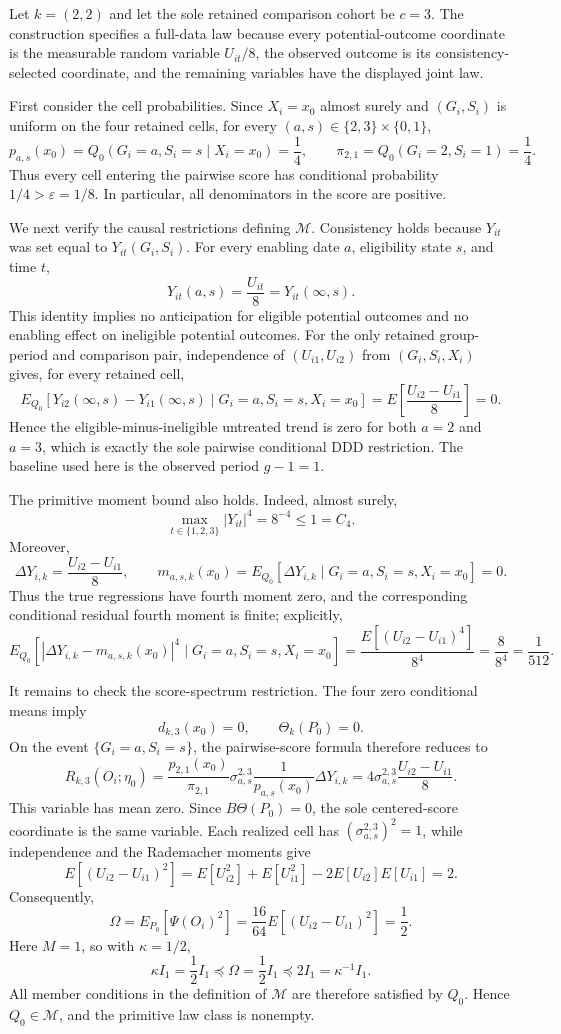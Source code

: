 Let \(k=(2,2)\) and let the sole retained comparison cohort be \(c=3\).  The construction specifies a full-data law because every potential-outcome coordinate is the measurable random variable \(U_{it}/8\), the observed outcome is its consistency-selected coordinate, and the remaining variables have the displayed joint law.

First consider the cell probabilities.  Since \(X_i=x_0\) almost surely and \((G_i,S_i)\) is uniform on the four retained cells, for every \((a,s)\in\{2,3\}\times\{0,1\}\),
\[
p_{a,s}(x_0)=Q_0(G_i=a,S_i=s\mid X_i=x_0)=\frac14,
\qquad
\pi_{2,1}=Q_0(G_i=2,S_i=1)=\frac14.
\]
Thus every cell entering the pairwise score has conditional probability \(1/4>\varepsilon=1/8\).  In particular, all denominators in the score are positive.

We next verify the causal restrictions defining \(\mathcal M\).  Consistency holds because \(Y_{it}\) was set equal to \(Y_{it}(G_i,S_i)\).  For every enabling date \(a\), eligibility state \(s\), and time \(t\),
\[
Y_{it}(a,s)=\frac{U_{it}}8=Y_{it}(\infty,s).
\]
This identity implies no anticipation for eligible potential outcomes and no enabling effect on ineligible potential outcomes.  For the only retained group-period and comparison pair, independence of \((U_{i1},U_{i2})\) from \((G_i,S_i,X_i)\) gives, for every retained cell,
\[
E_{Q_0}\!\left[Y_{i2}(\infty,s)-Y_{i1}(\infty,s)
 \mid G_i=a,S_i=s,X_i=x_0\right]
=E\!\left[\frac{U_{i2}-U_{i1}}8\right]=0.
\]
Hence the eligible-minus-ineligible untreated trend is zero for both \(a=2\) and \(a=3\), which is exactly the sole pairwise conditional DDD restriction.  The baseline used here is the observed period \(g-1=1\).

The primitive moment bound also holds.  Indeed, almost surely,
\[
\max_{t\in\{1,2,3\}}|Y_{it}|^4=8^{-4}\le 1=C_4.
\]
Moreover,
\[
\Delta Y_{i,k}=\frac{U_{i2}-U_{i1}}8,
\qquad
m_{a,s,k}(x_0)=E_{Q_0}[\Delta Y_{i,k}\mid G_i=a,S_i=s,X_i=x_0]=0.
\]
Thus the true regressions have fourth moment zero, and the corresponding conditional residual fourth moment is finite; explicitly,
\[
E_{Q_0}\!\left[|\Delta Y_{i,k}-m_{a,s,k}(x_0)|^4
 \mid G_i=a,S_i=s,X_i=x_0\right]
=\frac{E[(U_{i2}-U_{i1})^4]}{8^4}
=\frac{8}{8^4}=\frac1{512}.
\]

It remains to check the score-spectrum restriction.  The four zero conditional means imply
\[
d_{k,3}(x_0)=0,
\qquad
\Theta_k(P_0)=0.
\]
On the event \(\{G_i=a,S_i=s\}\), the pairwise-score formula therefore reduces to
\[
R_{k,3}(O_i;\eta_0)
=\frac{p_{2,1}(x_0)}{\pi_{2,1}}
  \sigma_{a,s}^{2,3}\frac{1}{p_{a,s}(x_0)}\Delta Y_{i,k}
=4\sigma_{a,s}^{2,3}\frac{U_{i2}-U_{i1}}8.
\]
This variable has mean zero.  Since \(B\Theta(P_0)=0\), the sole centered-score coordinate is the same variable.  Each realized cell has \((\sigma_{a,s}^{2,3})^2=1\), while independence and the Rademacher moments give
\[
E[(U_{i2}-U_{i1})^2]
=E[U_{i2}^2]+E[U_{i1}^2]-2E[U_{i2}]E[U_{i1}]
=2.
\]
Consequently,
\[
\Omega
=E_{P_0}[\Psi(O_i)^2]
=\frac{16}{64}E[(U_{i2}-U_{i1})^2]
=\frac12.
\]
Here \(M=1\), so with \(\kappa=1/2\),
\[
\kappa I_1=\frac12 I_1\preceq \Omega=\frac12 I_1
\preceq 2I_1=\kappa^{-1}I_1.
\]
All member conditions in the definition of \(\mathcal M\) are therefore satisfied by \(Q_0\).  Hence \(Q_0\in\mathcal M\), and the primitive law class is nonempty.